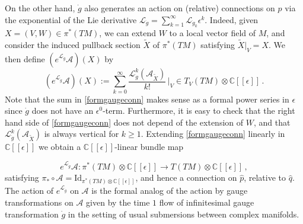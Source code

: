 \documentclass{article}
\theoremstyle{definition}
\numberwithin{equation}{section}
\begin{document}
On the other hand, $\dot{g}$ also generates an action on (relative)  connections on $\hat{p}$ via the exponential of the Lie derivative $\mathcal{L}_{\dot{g}}=\sum_{k=1}^{\infty}\mathcal{L}_{\dot{g}_k}\epsilon^k$. Indeed,  given $X=(V,W)\in \pi^*(TM)$, we can extend $W$ to a local vector field of $M$, and consider the induced pullback section $\widetilde{X}$ of $\pi^*(TM)$ satisfying $\widetilde{X}|_V=X$. We then define $(e^{\mathcal{L}_{\dot{g}}}\mathcal{A})(X)$ by 
\begin{equation}\label{formgaugeconn}
    (e^{\mathcal{L}_{\dot{g}}}\mathcal{A})(X):= \sum_{k=0}^{\infty}\frac{\mathcal{L}_{\dot{g}}^k(\mathcal{A}_{\widetilde{X}})}{k!}\,\Bigg|_{V}\in T_V(TM)\otimes \mathbb{C}[[\epsilon]]\,.
\end{equation}
Note that the sum in \eqref{formgaugeconn} makes sense as a formal power series in $\epsilon$ since $\dot{g}$ does not have an $\epsilon^{0}$-term. Furthermore, it is easy to check that the right hand side of \eqref{formgaugeconn} does not depend of the extension of $W$, and that $\mathcal{L}_{\dot{g}}^k(\mathcal{A}_{\widetilde{X}})$ is always vertical for $k\geq 1$. Extending \eqref{formgaugeconn} linearly in $\mathbb{C}[[\epsilon]]$ we obtain a $\mathbb{C}[[\epsilon]]$-linear bundle map 

\begin{equation*}
    e^{\mathcal{L}_{\dot{g}}}\mathcal{A}:\pi^*(TM)\otimes \mathbb{C}[[\epsilon]]\to T(TM)\otimes \mathbb{C}[[\epsilon]]\,,
\end{equation*}
satisfying $\pi_*\circ \mathcal{A}=\text{Id}_{\pi^*(TM)\otimes \mathbb{C}[[\epsilon]]}$, and hence a connection on $\hat{p}$, relative to $\hat{q}$.\\

The action of $e^{\mathcal{L}_{\dot{g}}}$ on $\mathcal{A}$ is the formal analog of the action by gauge transformations on  $\mathcal{A}$ given by the time $1$ flow of infinitesimal gauge transformation $\dot{g}$ in the setting of usual submersions between complex manifolds. \\
\end{document}
